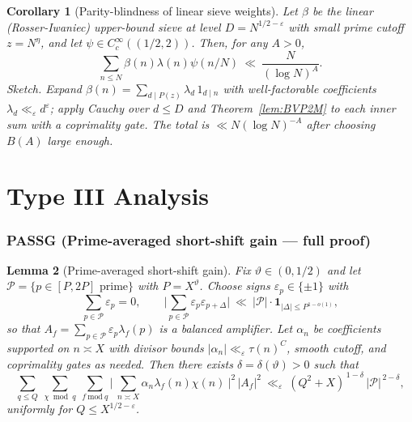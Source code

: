 \documentclass[11pt]{article}
\newtheorem{lemma}{Lemma}[part]
\newtheorem{corollary}[lemma]{Corollary}
\theoremstyle{definition}
\theoremstyle{remark}
\numberwithin{equation}{part}
\begin{document}
\begin{corollary}[Parity-blindness of linear sieve weights]\label{cor:parityblind}
	Let $\beta$ be the linear (Rosser-Iwaniec) upper-bound sieve at level $D=N^{1/2-\varepsilon}$ with small prime cutoff $z=N^{\eta}$, and let $\psi\in C_c^\infty((1/2,2))$. Then, for any $A>0$,
	\[
		\sum_{n\le N}\beta(n)\lambda(n)\psi(n/N)\ \ll\ \frac{N}{(\log N)^A}.
	\]
	\emph{Sketch.} Expand $\beta(n)=\sum_{d\mid P(z)}\lambda_d\,1_{d\mid n}$ with well-factorable coefficients $\lambda_d\ll_\varepsilon d^\varepsilon$; apply Cauchy over $d\le D$ and Theorem~\ref{lem:BVP2M} to each inner sum with a coprimality gate. The total is $\ll N(\log N)^{-A}$ after choosing $B(A)$ large enough.
\end{corollary}


\part{Type III Analysis}

\section{PASSG (Prime-averaged short-shift gain — full proof)}

\begin{lemma}[Prime-averaged short-shift gain]\label{lem:PASSG}
	Fix $\vartheta\in(0,1/2)$ and let $\mathcal P=\{p\in[P,2P]\text{ prime}\}$ with $P=X^\vartheta$.
	Choose signs $\varepsilon_p\in\{\pm1\}$ with
	\[
		\sum_{p\in\mathcal P}\varepsilon_p=0,
		\qquad
		\Big|\sum_{p\in\mathcal P}\varepsilon_p\varepsilon_{p+\Delta}\Big|
		\ \ll\ |\mathcal P|\cdot\mathbf1_{|\Delta|\le P^{1-o(1)}},
	\]
	so that $A_f=\sum_{p\in\mathcal P}\varepsilon_p\lambda_f(p)$ is a balanced amplifier.
	Let $\alpha_n$ be coefficients supported on $n\asymp X$ with divisor bounds $|\alpha_n|\ll_\varepsilon \tau(n)^C$, smooth cutoff, and coprimality gates as needed.
	Then there exists $\delta=\delta(\vartheta)>0$ such that
	\begin{equation}\label{eq:S2.4_goal}
		\sum_{q\le Q}\ \sum_{\chi\bmod q}\ \sum_{f\ \mathrm{mod}\ q}
		\Bigg|\ \sum_{n\asymp X}\alpha_n \lambda_f(n)\chi(n)\ \Bigg|^2\,|A_f|^2
		\ \ll_\varepsilon\ (Q^2+X)^{\,1-\delta}\,|\mathcal P|^{\,2-\delta},
	\end{equation}
	uniformly for $Q\le X^{1/2-\varepsilon}$.
\end{lemma}
\end{document}
